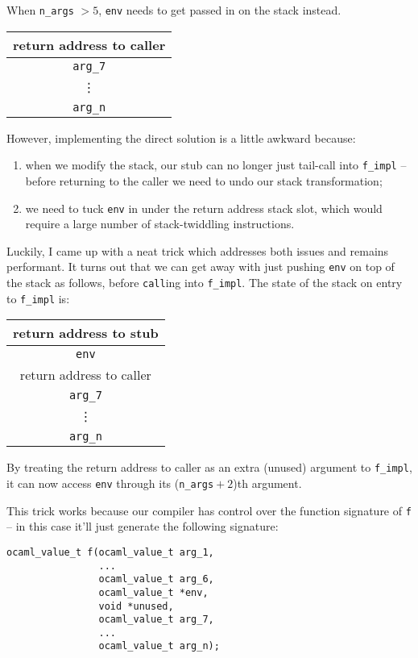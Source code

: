 \documentclass[12pt,a4paper,twoside,openright]{report}
\begin{document}
When \lstinline!n_args! $> 5$, \lstinline!env! needs to get passed in on the
stack instead.

\begin{tabular}{c}
  return address to caller
  \\ \hline\hline
  \lstinline!arg_7!
  \\ \hline
  \vdots
  \\ \hline
  \lstinline!arg_n!
\end{tabular}

However, implementing the direct solution is a little awkward because:
\begin{enumerate}
  \item when we modify the stack, our stub can no longer just tail-call
    into \lstinline!f_impl! -- before returning to the caller we need to undo
    our stack transformation;
  \item we need to tuck \lstinline!env! in under the return address
    stack slot, which would require a large number of stack-twiddling
    instructions.
\end{enumerate}

Luckily, I came up with a neat trick which addresses both issues and remains
performant. It turns out that we can get away with just pushing \lstinline!env!
on top of the stack as follows, before \lstinline!call!ing into
\lstinline!f_impl!. The state of the stack on entry to \lstinline!f_impl! is:

\begin{tabular}{c}
  return address to stub
  \\ \hline\hline
  \lstinline!env!
  \\ \hline
  return address to caller
  \\ \hline
  \lstinline!arg_7!
  \\ \hline
  \vdots
  \\ \hline
  \lstinline!arg_n!
\end{tabular}

By treating the return address to caller as an extra (unused) argument to
\lstinline!f_impl!, it can now access \lstinline!env! through its
(\lstinline{n_args}${}+2$)th argument.

This trick works because our compiler has control over the function signature
of \lstinline{f} -- in this case it'll just generate the following signature:

\begin{lstlisting}
ocaml_value_t f(ocaml_value_t arg_1,
                ...
                ocaml_value_t arg_6,
                ocaml_value_t *env,
                void *unused,
                ocaml_value_t arg_7,
                ...
                ocaml_value_t arg_n);
\end{lstlisting}
\end{document}
